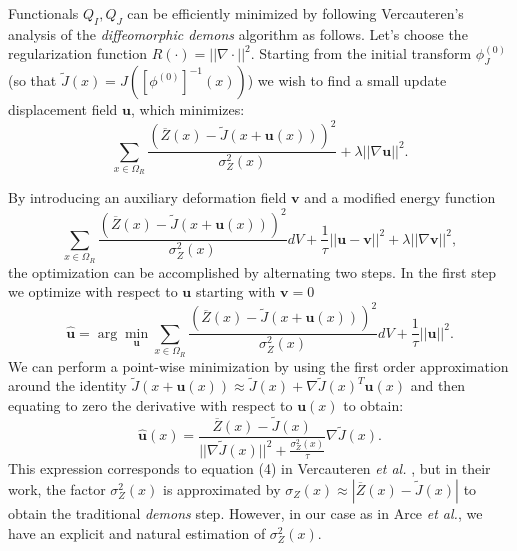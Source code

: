 Functionals $Q_{I}, Q_{J}$ can be efficiently minimized by following Vercauteren's analysis of the \textit{diffeomorphic demons} algorithm \cite{Vercauteren2009} as follows.
Let's choose the regularization function $R(\cdot) = ||\nabla \cdot||^{2}$. Starting from the initial transform $\phi^{(0)}_{J}$ (so that
$\tilde{J}(x) = J(\left[\phi^{(0)}\right]^{-1}(x))$) we wish to find a small update displacement field $\mathbf{u}$, which minimizes:
\begin{equation}\label{eq:vercauteren_cost}
    \sum_{x \in \Omega_{R}} \frac{\left(\overline{Z}(x) - \tilde{J}(x + \mathbf{u}(x))\right)^{2}}{\sigma^{2}_{Z}(x)} + \lambda ||\nabla \mathbf{u}||^{2}.
\end{equation}

By introducing an auxiliary deformation field $\mathbf{v}$ and a modified energy function
\begin{equation}\label{eq:vercauteren_extended_cost}
    \sum_{x \in \Omega_{R}} \frac{(\overline{Z}(x) - \tilde{J}(x + \mathbf{u}(x)))^{2}}{\sigma^{2}_{Z}(x)} dV + \frac{1}{\tau}||\mathbf{u}-\mathbf{v}||^{2}+\lambda ||\nabla \mathbf{v}||^{2},
\end{equation}
the optimization can be accomplished by alternating two steps. In the first step we optimize with respect to $\mathbf{u}$ starting with $\mathbf{v} = 0$
\begin{equation}\label{eq:vercauteren_step1}
    \widehat{\mathbf{u}} = \arg\min_{\mathbf{u}}\sum_{x \in \Omega_{R}} \frac{(\overline{Z}(x) - \tilde{J}(x+\mathbf{u}(x)))^{2}}{\sigma^{2}_{Z}(x)} dV + \frac{1}{\tau} ||\mathbf{u}||^{2}.
\end{equation}
We can perform a point-wise minimization by using the first order approximation around the identity
$\tilde{J}(x+\mathbf{u}(x)) \approx \tilde{J}(x) + \nabla \tilde{J}(x)^{T}\mathbf{u}(x)$ and then equating to zero the derivative with respect to $\mathbf{u}(x)$ to obtain:
\begin{equation}\label{eq:euler_lagrange_step1}
    \widehat{\mathbf{u}}(x) = \frac{\overline{Z}(x) - \tilde{J}(x)}{||\nabla \tilde{J}(x)||^{2} + \frac{\sigma_{Z}^{2}(x)}{\tau}}\nabla \tilde{J}(x).
\end{equation}
This expression corresponds to equation (4) in Vercauteren {\it et al.} \cite{Vercauteren2009}, but in their work, the factor $\sigma_{Z}^{2}(x)$
is approximated by $\sigma_{Z}(x) \approx |\overline{Z}(x) - \tilde{J}(x)|$ to obtain the traditional {\it demons} step. However, in our case as in Arce
{\it et al.}\cite{Arce-santana2014}, we have an explicit and natural estimation of $\sigma^{2}_{Z}(x)$.\\


